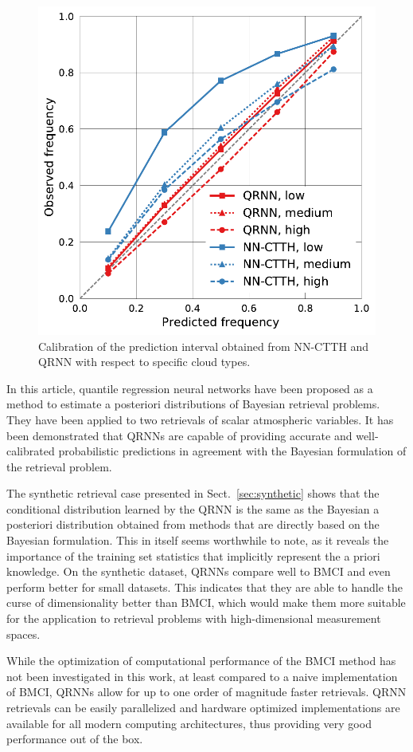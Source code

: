 \documentclass[journal abbreviation, manuscript]{copernicus}
\begin{document}
  \begin{figure}[hbpt!]
    \centering
    \includegraphics[width = 0.5\linewidth]{../plots/calibration_cloud_type}
    \caption{Calibration of the prediction interval obtained from NN-CTTH and QRNN
    with respect to specific cloud types.}
    \label{fig:calibration_cloud_type}
  \end{figure}


\conclusions  %
\label{sec:conclusions}

In this article, quantile regression neural networks have been proposed as a
method to estimate a posteriori distributions of Bayesian retrieval problems.
They have been applied to two retrievals of scalar atmospheric variables. It has
been demonstrated that QRNNs are capable of providing accurate and
well-calibrated probabilistic predictions in agreement with the Bayesian
formulation of the retrieval problem.

The synthetic retrieval case presented in Sect.~\ref{sec:synthetic} shows that
the conditional distribution learned by the QRNN is the same as the Bayesian a
posteriori distribution obtained from methods that are directly based on the
Bayesian formulation. This in itself seems worthwhile to note, as it reveals the
importance of the training set statistics that implicitly represent the a priori
knowledge. On the synthetic dataset, QRNNs compare well to BMCI and even perform
better for small datasets. This indicates that they are able to handle the
curse of dimensionality better than BMCI, which would make them more suitable
for the application to retrieval problems with high-dimensional measurement
spaces.

While the optimization of computational performance of the BMCI method has not been
investigated in this work, at least compared to a naive implementation of BMCI,
QRNNs allow for up to one order of magnitude faster retrievals. QRNN retrievals
can be easily parallelized and hardware optimized implementations are available
for all modern computing architectures, thus providing very good performance out
of the box.
\end{document}
